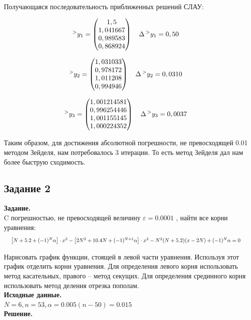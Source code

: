 \documentclass[14pt,a4paper]{scrartcl}
\begin{document}
Получающаяся последовательность приближенных решений СЛАУ:

$$
\prescript{>}{}{y_1} = 
\begin{pmatrix}
1,5      \\
1,041667 \\
0,989583 \\
0,868924
\end{pmatrix}
\quad
\Delta\prescript{>}{}{y_1} = 0,50
$$

$$
\prescript{>}{}{y_2} = 
\begin{pmatrix}
1,031033 \\
0,978172 \\
1,011208 \\
0,994946
\end{pmatrix}
\quad
\Delta\prescript{>}{}{y_2} = 0,0310
$$

$$
\prescript{>}{}{y_3} = 
\begin{pmatrix}
1,001214581\\
0,996254446\\
1,001155145\\
1,000224352
\end{pmatrix}
\quad
\Delta\prescript{>}{}{y_3} = 0,0037
$$

Таким образом, для достижения абсолютной погрешности, не превосходящей 0.01 методом Зейделя, нам потребовалось 3 итерации. То есть метод Зейделя дал нам более быструю сходимость.


\subsection*{Задание 2}
\textbf{Задание.}\\
C погрешностью, не превосходящей величину $\varepsilon = 0.0001$ , найти все корни уравнения:
\begin{equation*}
	\resizebox{\textwidth}{!}
	{
		$\left[N+5.2+(-1)^{N} \alpha\right] \cdot x^{3}-\left[2 N^{2}+10.4 N+(-1)^{N+1} \alpha\right] \cdot x^{2}-N^{2}(N+5.2)(x-2 N)+(-1)^{N} \alpha=0$
	}
\end{equation*}

Нарисовать график функции, стоящей в левой части уравнения. Используя этот график отделить корни уравнения. Для определения левого корня использовать метод касательных, правого – метод секущих. Для определения срединного корня использовать метод деления отрезка пополам.\\
\textbf{Исходные данные.}\\
$N = 6, n = 53, \alpha = 0.005(n-50) = 0.015$\\
\textbf{Решение.}\\
\end{document}
